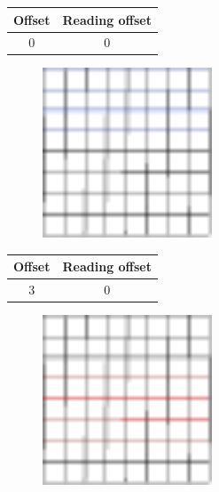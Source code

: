 \documentclass{beamer}
\begin{document}
\begin{frame}{}
    \begin{table}
        \centering
        \begin{tabular}{|c|c|}
            \hline
            Offset & Reading offset \\
            \hline
            0 & 0 \\
            \hline
        \end{tabular}
    \end{table}
    \begin{figure}
        \centering
        \includegraphics[width=0.45\textwidth]{grid_3r_1_ro_1.pdf}
        \label{fig:grid_3r_1_ro_1}
    \end{figure}
\end{frame}

\begin{frame}{}
    \begin{table}
        \centering
        \begin{tabular}{|c|c|}
            \hline
            Offset & Reading offset \\
            \hline
            3 & 0 \\
            \hline
        \end{tabular}
    \end{table}
    \begin{figure}
        \centering
        \includegraphics[width=0.45\textwidth]{grid_3r_2.pdf}
        \label{fig:grid_3r_2}
    \end{figure}
\end{frame}
\end{document}
